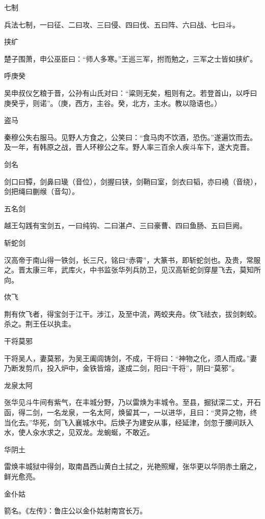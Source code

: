 \documentclass[a4paper,12pt,UTF8,twoside]{ctexbook}
\begin{document}
    七制
    
    兵法七制，一曰征、二曰攻、三曰侵、四曰伐、五曰阵、六曰战、七曰斗。
    
    挟纩
    
    楚子围萧，申公巫臣曰：“师人多寒。”王巡三军，拊而勉之，三军之士皆如挟纩。
    
    呼庚癸
    
    吴申叔仪乞粮于晋，公孙有山氏对曰：“粱则无矣，粗则有之。若登首山，以呼曰庚癸乎，则诺”。（庚，西方，主谷。癸，北方，主水。教以隐语也。）
    
    盗马
    
    秦穆公失右服马。见野人方食之，公笑曰：“食马肉不饮酒，恐伤。”遂遍饮而去。及一年，有韩原之战，晋人环穆公之车。野人率三百余人疾斗车下，遂大克晋。
    
    剑名
    
    剑口曰镡，剑鼻曰璏（音位），剑握曰铗，剑鞘曰室，剑衣曰韬，亦曰襓（音绕），剑把绳曰蒯缑（音勾）。
    
    五名剑
    
    越王勾践有宝剑五，一曰纯钩、二曰湛卢、三曰豪曹、四曰鱼肠、五曰巨阙。
    
    斩蛇剑
    
    汉高帝于南山得一铁剑，长三尺，铭曰“赤霄”，大篆书，即斩蛇剑也。及贵，常服之。晋太康三年，武库火，中书监张华列兵防卫，见汉高斩蛇剑穿屋飞去，莫知所向。
    
    佽飞
    
    荆有佽飞者，得宝剑于江干。涉江，及至中流，两蛟夹舟。佽飞祛衣，拔剑刺蛟。杀之。荆王任以执圭。
    
    干将莫邪
    
    干将吴人，妻莫邪，为吴王阖闾铸剑，不成，干将曰：“神物之化，须人而成。”妻乃断发剪爪，投入炉中，金铁皆熔，遂成二剑，阳曰“干将”，阴曰“莫邪”。
    
    龙泉太阿
    
    张华见斗牛间有紫气，在丰城分野，乃以雷焕为丰城令。至县，掘狱深二丈，开石函，得二剑，一名龙泉，一名太阿，焕留其一，一以进华，且曰：“灵异之物，终当化去。”华死，剑飞入襄城水中。后焕子为建安从事，经延津，剑忽于腰间跃入水，使人汆水求之，见双龙。龙蜿蜒，不敢近。
    
    华阴土
    
    雷焕丰城狱中得剑，取南昌西山黄白土拭之，光艳照耀，张华更以华阴赤土磨之，鲜光愈亮。
    
    金仆姑
    
    箭名。《左传》：鲁庄公以金仆姑射南宫长万。
    
\end{document}
